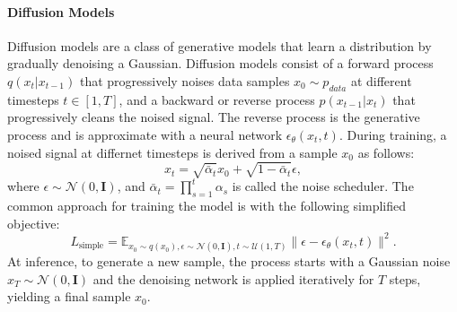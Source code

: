 \paragraph{\textbf{Diffusion Models}}
\label{sec:diffusion}
Diffusion models \cite{ddpm2020Ho,song2021ddim} are a class of generative models that learn a distribution by gradually denoising a Gaussian. 
Diffusion models consist of a forward process $q(x_t|x_{t-1})$ that progressively noises data samples $x_0 \sim p_{data}$ at different timesteps $t\in [1,T]$, and a backward or reverse process $p(x_{t-1}|x_t)$ that progressively cleans the noised signal. 
The reverse process is the generative process and is approximate with a neural network $\epsilon_{\theta}(x_t,t)$.
During training, a noised signal at differnet timesteps is derived from a sample $x_0$ as follows:
\begin{equation}
\label{eq:xt}
x_t = \sqrt{\bar{\alpha}_t} x_0 + \sqrt{1 - \bar{\alpha}_t} \epsilon,
\end{equation}
where $\epsilon \sim \mathcal{N}(0, \mathbf{I})$, and $\bar{\alpha}_t = \prod_{s=1}^t \alpha_s$ is called the noise scheduler.
The common approach for training the model is with the following simplified objective:
\begin{equation}
\label{eq:lsimple}
L_\text{simple} = \mathbb{E}_{x_0\sim q(x_0), \epsilon \sim \mathcal{N}(0, \mathbf{I}), t \sim \mathcal{U}(1, T)} \big\| \epsilon - \epsilon_\theta(x_t, t) \big\|^2.
\end{equation}
At inference, to generate a new sample, the process starts with a Gaussian noise $x_T \sim \mathcal{N}(0, \mathbf{I})$ and the denoising network is applied iteratively for $T$ steps, yielding a final sample $x_0$.













